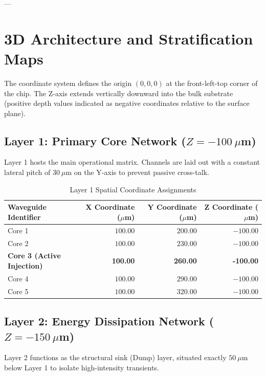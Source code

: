 \documentclass[11pt,a4paper]{article}
\begin{document}
---

\section{3D Architecture and Stratification Maps}
The coordinate system defines the origin $(0,0,0)$ at the front-left-top corner of the chip. The Z-axis extends vertically downward into the bulk substrate (positive depth values indicated as negative coordinates relative to the surface plane).

\subsection{Layer 1: Primary Core Network ($Z = -100\ \mu$m)}
Layer 1 hosts the main operational matrix. Channels are laid out with a constant lateral pitch of $30\ \mu$m on the Y-axis to prevent passive cross-talk.

\begin{table}[h!]
\centering
\caption{Layer 1 Spatial Coordinate Assignments}
\vspace{0.2cm}
\begin{tabular}{lrrr}
\toprule
\textbf{Waveguide Identifier} & \textbf{X Coordinate ($\mu$m)} & \textbf{Y Coordinate ($\mu$m)} & \textbf{Z Coordinate ($\mu$m)} \\
\midrule
Core 1 & $100.00$ & $200.00$ & $-100.00$ \\
Core 2 & $100.00$ & $230.00$ & $-100.00$ \\
\textbf{Core 3 (Active Injection)} & \textbf{100.00} & \textbf{260.00} & \textbf{-100.00} \\
Core 4 & $100.00$ & $290.00$ & $-100.00$ \\
Core 5 & $100.00$ & $320.00$ & $-100.00$ \\
\bottomrule
\end{tabular}
\end{table}

\subsection{Layer 2: Energy Dissipation Network ($Z = -150\ \mu$m)}
Layer 2 functions as the structural sink (Dump) layer, situated exactly $50\ \mu$m below Layer 1 to isolate high-intensity transients.
\end{document}
